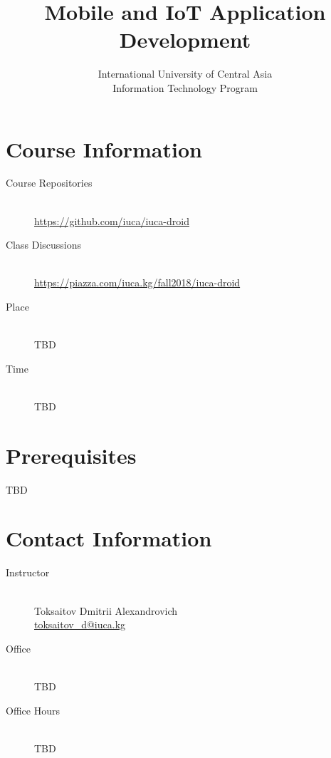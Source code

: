 \documentclass[12pt,a4paper,oneside]{article}
\begin{document}
    \title{Mobile and IoT Application Development}
    \author{
        International University of Central Asia\\
        Information Technology Program
    }
    \date{}
    \maketitle

    \section{Course Information}

        \begin{description}
            \item[Course Repositories]\hfill\\
                \url{https://github.com/iuca/iuca-droid}
            \item[Class Discussions]\hfill\\
                \url{https://piazza.com/iuca.kg/fall2018/iuca-droid}
            \item[Place]\hfill\\
                TBD
            \item[Time]\hfill\\
                TBD
        \end{description}

    \section{Prerequisites}

        TBD

    \section{Contact Information}

        \begin{description}
            \item[Instructor]\hfill\\
                Toksaitov Dmitrii Alexandrovich\\
                \href{mailto:toksaitov_d@iuca.kg}{toksaitov\_d@iuca.kg}
            \item[Office]\hfill\\
                TBD
            \item[Office Hours]\hfill\\
                TBD
        \end{description}
\end{document}
